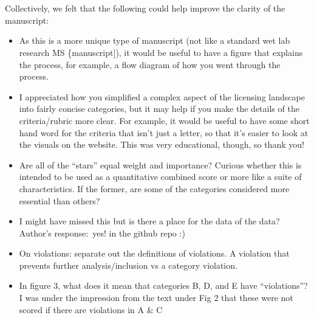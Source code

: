 \documentclass[10pt]{article}
\providecommand{\tightlist}{\setlength{\itemsep}{0pt}\setlength{\parskip}{0pt}}%
\begin{document}
{\label{234021}}

\section*{}

{\label{234021}}

Collectively, we felt that the following could help improve the clarity
of the manuscript:~

\begin{itemize}
\tightlist
\item
  As this is a more unique type of manuscript (not like a standard wet
  lab research MS \{manuscript{]}), it would be useful to have a figure
  that explains the process, for example, a flow diagram of how you went
  through the process.
\item
  I appreciated how you simplified a complex aspect of the licensing
  landscape into fairly concise categories, but it may help if you make
  the details of the criteria/rubric more clear. For example, it would
  be useful to have some short hand word for the criteria that isn't
  just a letter, so that it's easier to look at the visuals on the
  website. This was very educational, though, so thank you!
\end{itemize}

\begin{itemize}
\tightlist
\item
  Are all of the ``stars'' equal weight and importance? Curious whether
  this is intended to be used as a quantitative combined score or more
  like a suite of characteristics. If the former, are some of the
  categories considered more essential than others?
\end{itemize}

\begin{itemize}
\tightlist
\item
  I might have missed this but is there a place for the data of the
  data?~ Author's response:~yes! in the github repo :)
\end{itemize}

\begin{itemize}
\tightlist
\item
  On violations: separate out the definitions of violations. A violation
  that prevents further analysis/inclusion vs a category violation.
\end{itemize}

\begin{itemize}
\tightlist
\item
  In figure 3, what does it mean that categories B, D, and E have
  ``violations''? I was under the impression from the text under Fig 2
  that these were not scored if there are violations in A \& C
\end{itemize}
\end{document}
